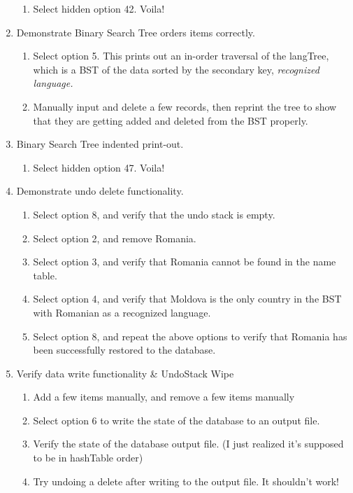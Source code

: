 \documentclass{article}
\begin{document}
\begin{enumerate}
        \begin{enumerate}
            \item{Select hidden option 42. Voila!}
        \end{enumerate}
    \item{Demonstrate Binary Search Tree orders items correctly.}
        \begin{enumerate}
            \item{Select option 5. This prints out an in-order traversal of the langTree, which is a BST of the data sorted by the secondary key, \textit{recognized language.}}
            \item{Manually input and delete a few records, then reprint the tree to show that they are getting added and deleted from the BST properly.}
        \end{enumerate}
    \item{Binary Search Tree indented print-out.}
        \begin{enumerate}
            \item{Select hidden option 47. Voila!}
        \end{enumerate}
    \item{Demonstrate undo delete functionality.}
        \begin{enumerate}
            \item{Select option 8, and verify that the undo stack is empty.}
            \item{Select option 2, and remove Romania.}
            \item{Select option 3, and verify that Romania cannot be found in the name table.}
            \item{Select option 4, and verify that Moldova is the only country in the BST with Romanian as a recognized language.}
            \item{Select option 8, and repeat the above options to verify that Romania has been successfully restored to the database.}
        \end{enumerate}
    \item{Verify data write functionality \& UndoStack Wipe}
        \begin{enumerate}
            \item{Add a few items manually, and remove a few items manually}
            \item{Select option 6 to write the state of the database to an output file.}
            \item{Verify the state of the database output file. (I just realized it's supposed to be in hashTable order)}
            \item{Try undoing a delete after writing to the output file. It shouldn't work!}
        \end{enumerate}
\end{enumerate}
\end{document}
